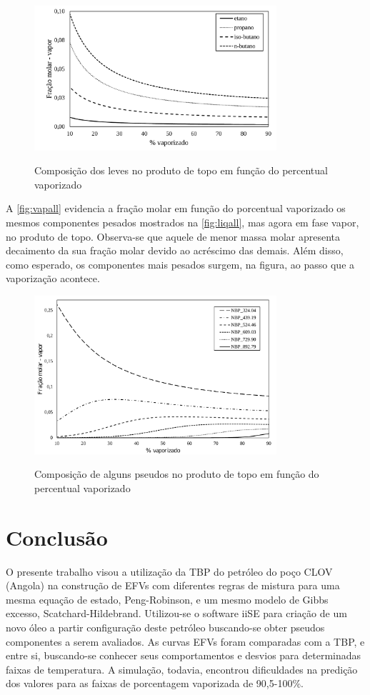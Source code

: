 \begin{figure}[htb]
\centering
{\includegraphics[width=0.8\textwidth]{img/trab3vap.pdf}} 
\caption{Composição dos leves no produto de topo em função do percentual
vaporizado}
\label{fig:vap}
\end{figure}

A \autoref{fig:vapall} evidencia a fração molar em função do porcentual vaporizado
os mesmos componentes pesados mostrados na \autoref{fig:liqall}, mas agora em
fase vapor, no produto de topo. Observa-se que aquele de menor massa molar
apresenta decaimento da sua fração molar devido ao acréscimo das demais. Além disso, como esperado, os 
componentes mais pesados surgem, na figura, ao passo que a vaporização
acontece.

\clearpage

\begin{figure}[htb]
\centering
{\includegraphics[width=0.8\textwidth]{img/trab3vapall.pdf}} 
\caption{Composição de alguns pseudos no produto de topo em função do
percentual vaporizado}
\label{fig:vapall}
\end{figure}

\section{Conclusão}  
O presente trabalho visou a utilização da TBP do petróleo do poço CLOV (Angola) 
na construção de EFVs com diferentes regras de mistura para uma mesma equação
de estado, Peng-Robinson, e um mesmo modelo de Gibbs excesso,
Scatchard-Hildebrand. Utilizou-se o software iiSE para criação de um novo óleo 
a partir configuração deste petróleo buscando-se obter pseudos componentes a 
serem avaliados. As curvas EFVs foram comparadas com a TBP, e entre si, 
buscando-se conhecer seus comportamentos e desvios para determinadas faixas de 
temperatura. A simulação, todavia, encontrou dificuldades na predição dos valores 
para as faixas de porcentagem vaporizada de 90,5-100{\%}.

